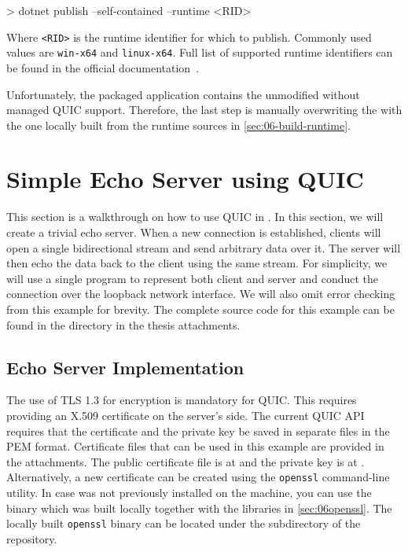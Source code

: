 \begin{myVerbatim}
> dotnet publish --self-contained --runtime <RID>
\end{myVerbatim}

Where \texttt{<RID>} is the runtime identifier for which to publish. Commonly used values are
\texttt{win-x64} and \texttt{linux-x64}. Full list of supported runtime identifiers can be found in
the official \dotnet{} documentation~\cite{dotnetRIDs}.

Unfortunately, the packaged application contains the unmodified \SystemNetQuicDll{} without managed
QUIC support. Therefore, the last step is manually overwriting the \SystemNetQuicDll{} with the one
locally built from the \dotnet{} runtime sources in \autoref{sec:06-build-runtime}.

\section{Simple Echo Server using QUIC}\label{sec:06tutorial}

This section is a walkthrough on how to use QUIC in \dotnet{}. In this section, we will create a
trivial echo server. When a new connection is established, clients will open a single bidirectional
stream and send arbitrary data over it. The server will then echo the data back to the client using
the same stream. For simplicity, we will use a single \dotnet{} program to represent both client and
server and conduct the connection over the loopback network interface. We will also omit error
checking from this example for brevity. The complete source code for this example can be found in
the  directory in the thesis attachments.

\subsection{Echo Server Implementation}

The use of TLS 1.3 for encryption is mandatory for QUIC\@. This requires providing an X.509
certificate on the server's side. The current QUIC API requires that the certificate and the private
key be saved in separate files in the PEM format. Certificate files that can be used in this example
are provided in the attachments. The public certificate file is at  and the
private key is at . Alternatively, a new certificate can be created using
the \texttt{openssl} command-line utility. In case \libopenssl{} was not previously installed on the
machine, you can use the binary which was built locally together with the libraries in
\autoref{sec:06openssl}. The locally built \texttt{openssl} binary can be located under the
 subdirectory of the \libopenssl{} repository.

